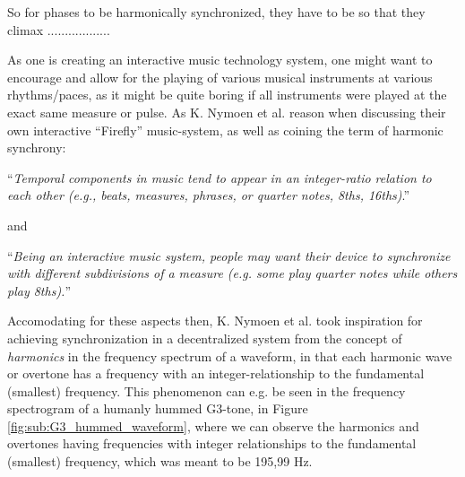 So for phases to be harmonically synchronized, they have to be so that they climax ..................

As one is creating an interactive music technology system, one might want to encourage and allow for the playing of various musical instruments at various rhythms/paces, as it might be quite boring if all instruments were played at the exact same measure or pulse. As K. Nymoen et al. \cite{nymoen_synch} reason when discussing their own interactive ``Firefly'' music-system, as well as coining the term of harmonic synchrony: \nl

``\textit{Temporal components in music tend to appear in an integer-ratio relation to each other (e.g., beats, measures, phrases, or quarter notes, 8ths, 16ths)}.'' \nl

and \nl

``\textit{Being an interactive music system, people may want their device to synchronize with different subdivisions of a measure (e.g. some play quarter notes while others play 8ths).}'' \nl

Accomodating for these aspects then, K. Nymoen et al. \cite{nymoen_synch} took inspiration for achieving synchronization in a decentralized system from the concept of \textit{harmonics} in the frequency spectrum of a waveform, in that each harmonic wave or overtone has a frequency with an integer-relationship to the fundamental (smallest) frequency. This phenomenon can e.g. be seen in the frequency spectrogram of a humanly hummed G3-tone, in Figure \ref{fig:sub:G3_hummed_waveform}, where we can observe the harmonics and overtones having frequencies with integer relationships to the fundamental (smallest) frequency, which was meant to be 195,99 Hz.


